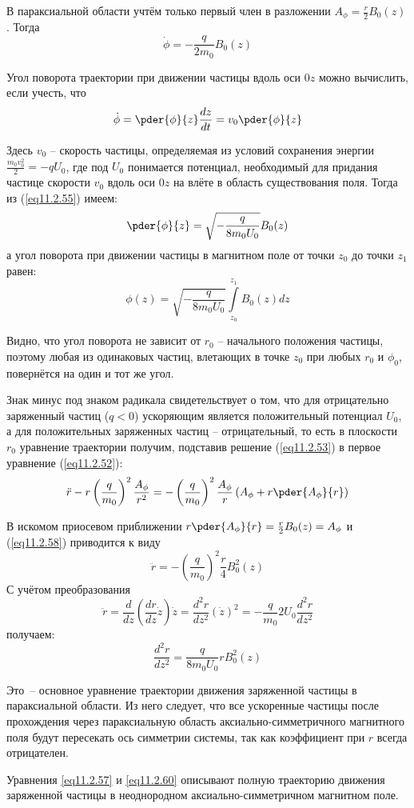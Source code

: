 В параксиальной области учтём только первый член в разложении 
\( A_\phi = \frac{r}{2} B_0(z)\). Тогда
\[
	\dot{\phi} = -\frac{q}{2m_0}B_0(z)
\]

Угол поворота траектории при движении частицы вдоль оси \( 0z \) можно 
вычислить, если учесть, что 
\begin{equation}
	\dot{\phi} = \pder{\phi}{z}\frac{dz}{dt} = v_0 \pder{\phi}{z}
	\label{eq11.2.55}
\end{equation}

Здесь \( v_0 \) -- скорость частицы, определяемая из условий сохранения 
энергии \( \frac{m_0 v_0^2}{2} = -qU_0 \), где под \( U_0 \) понимается 
потенциал, необходимый для придания частице скорости \( v_0 \) вдоль оси 
\( 0z \) на влёте в область существования поля. Тогда из (\ref{eq11.2.55}) 
имеем:
\[
	\pder{\phi}{z} = \sqrt{-\frac{q}{8m_0 U_0}} B_0(z)
\]
а угол поворота при движении частицы в магнитном поле от точки \( z_0 \) до 
точки \( z_1 \) равен:
\begin{equation}
	\phi(z) = \sqrt{-\frac{q}{8m_0 U_0}} \int\limits_{z_0}^{z_1} B_0(z) dz
	\label{eq11.2.57}
\end{equation}

Видно, что угол поворота не зависит от \( r_0 \) -- начального положения 
частицы, поэтому любая из одинаковых частиц, влетающих в точке \( z_0 \) при 
любых \( r_0 \) и \( \phi_0 \), повернётся на один и тот же угол. 

Знак минус под знаком радикала свидетельствует о том, что для отрицательно 
заряженный частиц (\( q < 0 \)) ускоряющим является положительный потенциал 
\( U_0 \), а для положительных заряженных частиц -- отрицательный, то есть в 
плоскости \( r_0 \) уравнение траектории получим, подставив решение 
(\ref{eq11.2.53}) в первое уравнение (\ref{eq11.2.52}):
\begin{equation}
	\ddot{r} - r\left( \frac{q}{m_0}\right)^2 \frac{A_\phi}{r^2} = 
		-\left( \frac{q}{m_0} \right)^2 \frac{A_\phi}{r}
		\left( A_\phi + r\pder{A_\phi}{r} \right)
	\label{eq11.2.58}
\end{equation}

В искомом приосевом приближении 
\( r\pder{A_\phi}{r} = \frac{r}{2} B_0(z) = A_\phi \) и (\ref{eq11.2.58}) 
приводится к виду
\[
	\ddot{r} = -\left( \frac{q}{m_0} \right)^2 \frac{r}{4} B_0^2(z)
\]
С учётом преобразования
\[
	\ddot{r} = \frac{d}{dz}\left( \frac{dr}{dz}\dot{z} \right)\dot{z} = 
		\frac{d^2 r}{dz^2}(\dot{z})^2 = -\frac{q}{m_0}2U_0\frac{d^2 r}{dz^2}
\]
получаем:
\begin{equation}
	\frac{d^2 r}{dz^2} = \frac{q}{8m_0 U_0}rB_0^2(z)
	\label{eq11.2.60}
\end{equation}

Это~-- основное уравнение траектории движения заряженной частицы в параксиальной
области. Из него следует, что все ускоренные частицы после прохождения через
параксиальную область аксиально-симметричного магнитного поля будут пересекать
ось симметрии системы, так как коэффициент при \( r \) всегда отрицателен.

Уравнения \eqref{eq11.2.57} и \eqref{eq11.2.60} описывают полную траекторию
движения заряженной частицы в неоднородном аксиально-симметричном магнитном
поле.
